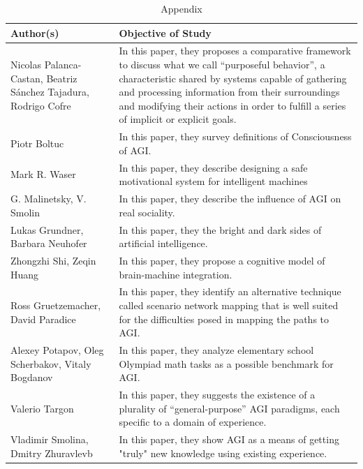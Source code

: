 \documentclass{article}
\begin{document}
\begin{table}
    \caption{Appendix}
    \centering
    \renewcommand{\arraystretch}{3}
    \begin{tabular}{ |p{5cm}|p{10cm}|  }
    \hline
    Author(s) & Objective of Study\\
    \hline
    Nicolas Palanca-Castan, Beatriz Sánchez Tajadura, Rodrigo Cofre & In this paper, they proposes a comparative framework to discuss what we call “purposeful behavior”, a characteristic shared by systems capable of gathering and processing information from their surroundings and modifying their actions in order to fulfill a series of implicit or explicit goals. \\

    Piotr Boltuc & In this paper, they survey definitions of Consciousness of AGI. \\

    Mark R. Waser & In this paper, they describe designing a safe motivational system for intelligent machines \\

    G. Malinetsky, V. Smolin & In this paper, they describe the influence of AGI on real sociality. \\

    Lukas Grundner, Barbara Neuhofer & In this paper, they the bright and dark sides of artificial intelligence. \\

    Zhongzhi Shi, Zeqin Huang & In this paper, they propose a cognitive model of brain-machine integration. \\

    Ross Gruetzemacher, David Paradice & In this paper, they identify an alternative technique called scenario network mapping that is well suited for the difficulties posed in mapping the paths to AGI. \\

    Alexey Potapov, Oleg Scherbakov, Vitaly Bogdanov & In this paper, they analyze elementary school Olympiad math tasks as a possible benchmark for AGI. \\

    Valerio Targon & In this paper, they suggests the existence of a plurality of “general-purpose” AGI paradigms, each specific to a domain of experience. \\

    Vladimir Smolina, Dmitry Zhuravlevb & In this paper, they show AGI as a means of getting "truly" new knowledge using existing experience. \\

    \hline
    \end{tabular}
\end{table}
\end{document}
